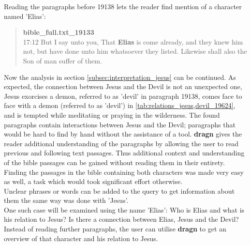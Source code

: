 Reading the paragraphs before 19138 lets the reader find mention of a character named 'Elias':
\blockquote{
\textbf{bible\_full.txt\_19133}\\
17:12 But I say unto you, That \textbf{Elias} is come already, and they knew him not, but have done unto him whatsoever they listed. Likewise shall also the Son of man suffer of them.}
Now the analysis in section \ref{subsec:interpretation_jesus} can be continued. As expected, the connection between Jesus and the Devil is not an unexpected one, Jesus exorcises a demon, referred to as 'devil' in paragraph 19138, comes face to face with a demon (referred to as 'devil') in \ref{tab:relations_jesus,devil_19624}, and is tempted while meditating or praying in the wilderness. The found paragraphs contain interactions between Jesus and the Devil; paragraphs that would be hard to find by hand without the assistance of a tool. \textbf{dragn} gives the reader additional understanding of the paragraphs by allowing the user to read previous and following text passages. Thus additional context and understanding of the bible passages can be gained without reading them in their entirety.\\
Finding the passages in the bible containing both characters was made very easy as well, a task which would took significant effort otherwise.\\
Unclear phrases or words can be added to the query to get information about them the same way was done with 'Jesus'.\\
One such case will be examined using the name 'Elias': Who is Elias and what is his relation to Jesus? Is there a connection between Elias, Jesus and the Devil? Instead of reading further paragraphs, the user can utilise \textbf{dragn} to get an overview of that character and his relation to Jesus.

%
%
%
%
\clearpage

